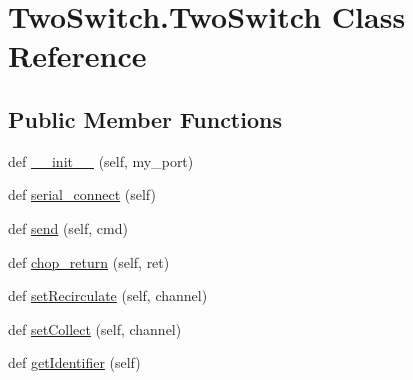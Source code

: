 \hypertarget{class_two_switch_1_1_two_switch}{}\section{Two\+Switch.\+Two\+Switch Class Reference}
\label{class_two_switch_1_1_two_switch}
\subsection*{Public Member Functions}
\begin{DoxyCompactItemize}
\item 
def \mbox{\hyperlink{class_two_switch_1_1_two_switch_a762f6622ca527b12104b0593378f87fb}{\+\_\+\+\_\+init\+\_\+\+\_\+}} (self, my\+\_\+port)
\item 
def \mbox{\hyperlink{class_two_switch_1_1_two_switch_ad816a09389ad0fb8ea56471aa4e8819f}{serial\+\_\+connect}} (self)
\item 
def \mbox{\hyperlink{class_two_switch_1_1_two_switch_a00b015b6f700f4d524056ff1c9de7c72}{send}} (self, cmd)
\item 
def \mbox{\hyperlink{class_two_switch_1_1_two_switch_a99d8b3d50bedbf126e1fbe10506e501f}{chop\+\_\+return}} (self, ret)
\item 
def \mbox{\hyperlink{class_two_switch_1_1_two_switch_a9c0f7d8f4a2af542cf574c11a9cee709}{set\+Recirculate}} (self, channel)
\item 
def \mbox{\hyperlink{class_two_switch_1_1_two_switch_a755481c98e9abd57c5307217df83795b}{set\+Collect}} (self, channel)
\item 
def \mbox{\hyperlink{class_two_switch_1_1_two_switch_ac5eb2e77087de5dc473a0722b16863a5}{get\+Identifier}} (self)
\end{DoxyCompactItemize}
